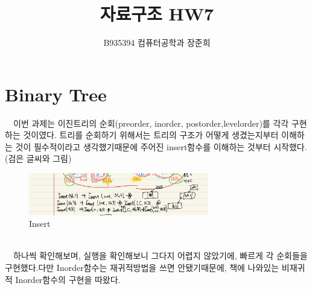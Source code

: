 \documentclass[a4paper,11pt]{article}
\begin{document}
\title{자료구조 HW7}
\author{B935394 컴퓨터공학과 장준희}
\maketitle
\newpage

\section{Binary Tree}
\ \ 이번 과제는 이진트리의 순회(preorder, inorder, postorder,levelorder)를 각각 구현하는 것이였다. 트리를 순회하기 위해서는 트리의 구조가 어떻게 생겼는지부터 이해하는 것이 필수적이라고 생각했기때문에 주어진 insert함수를 이해하는 것부터 시작했다.(검은 글씨와 그림)\\
\begin{figure}[h]
\begin{center}
\includegraphics[width=0.7\textwidth]{bt_insert}
\caption{Insert}
\label{fig:fig1}
\end{center}
\end{figure} 
\\\ \ 하나씩 확인해보며, 실행을 확인해보니 그다지 어렵지 않았기에, 빠르게 각 순회들을 구현했다.다만 Inorder함수는 재귀적방법을 쓰면 안됐기때문에, 책에 나와있는 비재귀적 Inorder함수의 구현을 따왔다.
\end{document}
